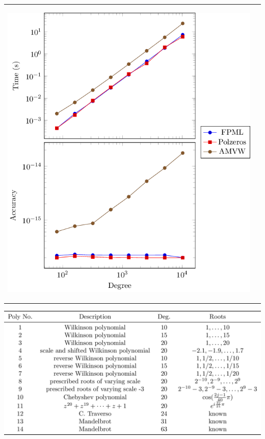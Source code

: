 \documentclass[20 pt, a0paper, portrait]{tikzposter}
\begin{document}
\begin{columns}
{\begin{center}
\begin{tabular}{ p{12cm} p{12cm}}
\begin{tikzfigure}
		\includegraphics[scale=0.44]{../tests/figures/unity.png}
		\end{tikzfigure}
	\end{tabular}
	\vspace*{-2em}
	\begin{tikzfigure}
		\includegraphics[scale=0.26]{../tests/figures/spec_poly_list.png}

\end{tikzfigure}
\end{center}}
\end{columns}
\end{document}
